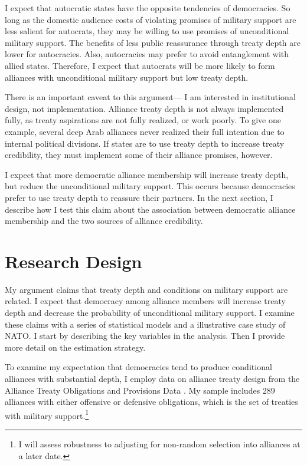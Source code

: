 \documentclass[12pt]{article}
\begin{document}
I expect that autocratic states have the opposite tendencies of democracies.
So long as the domestic audience costs of violating promises of military support are less salient for autocrats, they may be willing to use promises of unconditional military support. 
The benefits of less public reassurance through treaty depth are lower for autocracies. 
Also, autocracies may prefer to avoid entanglement with allied states. 
Therefore, I expect that autocrats will be more likely to form alliances with unconditional military support but low treaty depth. 


There is an important caveat to this argument--- I am interested in institutional design, not implementation.
Alliance treaty depth is not always implemented fully, as treaty aspirations are not fully realized, or work poorly. 
To give one example, several deep Arab alliances never realized their full intention due to internal political divisions.  
If states are to use treaty depth to increase treaty credibility, they must implement some of their alliance promises, however. 


I expect that more democratic alliance membership will increase treaty depth, but reduce the unconditional military support.  
This occurs because democracies prefer to use treaty depth to reassure their partners. 
In the next section, I describe how I test this claim about the association between democratic alliance membership and the two sources of alliance credibility. 




\section{Research Design}


My argument claims that treaty depth and conditions on military support are related. 
I expect that democracy among alliance members will increase treaty depth and decrease the probability of unconditional military support. 
I examine these claims with a series of statistical models and a illustrative case study of NATO. 
I start by describing the key variables in the analysis. 
Then I provide more detail on the estimation strategy. 


To examine my expectation that democracies tend to produce conditional alliances with substantial depth, I employ data on alliance treaty design from the Alliance Treaty Obligations and Provisions Data \citep{Leedsetal2002}. 
My sample includes 289 alliances with either offensive or defensive obligations, which is the set of treaties with military support.\footnote{I will assess robustness to adjusting for non-random selection into alliances at a later date.} 
\end{document}
